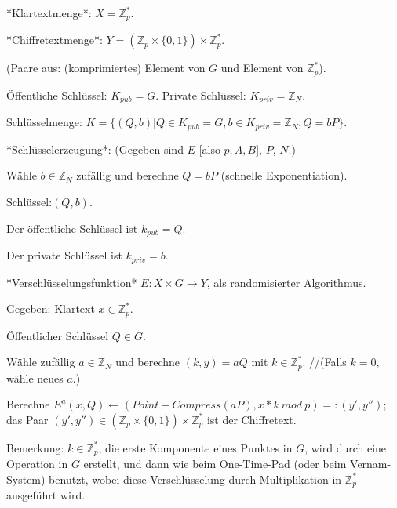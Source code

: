 \documentclass[a4paper]{article}
\begin{document}
\begin{multicols}{3}
        *Klartextmenge*: $X=\mathbb{Z}^*_p$.

        *Chiffretextmenge*: $Y=(\mathbb{Z}_p \times\{0,1\})\times\mathbb{Z}^*_p$.
        \begin{itemize*}
            \item (Paare aus: (komprimiertes) Element von $G$ und Element von $\mathbb{Z}^*_p$).
            \item Öffentliche Schlüssel: $K_{pub}=G$. Private Schlüssel: $K_{priv}=\mathbb{Z}_N$.
            \item Schlüsselmenge: $K=\{(Q,b)|Q\in K_{pub} = G,b\in K_{priv} =\mathbb{Z}_N,Q=bP\}$.
        \end{itemize*}

        *Schlüsselerzeugung*: (Gegeben sind $E$ [also $p,A,B$], $P$, $N$.)
        \begin{itemize*}
            \item Wähle $b\in\mathbb{Z}_N$ zufällig und berechne $Q=bP$ (schnelle Exponentiation).
            \item Schlüssel:$(Q,b)$.
            \item Der öffentliche Schlüssel ist $k_{pub}=Q$.
            \item Der private Schlüssel ist $k_{priv}=b$.
        \end{itemize*}

        *Verschlüsselungsfunktion* $E:X\times G\rightarrow Y$, als randomisierter Algorithmus.
        \begin{itemize*}
            \item Gegeben: Klartext $x\in\mathbb{Z}^*_p$.
            \item Öffentlicher Schlüssel $Q\in G$.
            \item Wähle zufällig $a\in\mathbb{Z}_N$ und berechne $(k,y) =aQ$ mit $k\in\mathbb{Z}^*_p$. //(Falls $k=0$, wähle neues $a$.)
            \item Berechne $E^a (x,Q)\leftarrow (Point-Compress(aP),x*k\ mod\ p) =: (y',y'');$ das Paar $(y',y'')\in(\mathbb{Z}_p\times\{0,1\})\times\mathbb{Z}^*_p$ ist der Chiffretext.
        \end{itemize*}

        Bemerkung: $k\in\mathbb{Z}^*_p$, die erste Komponente eines Punktes in $G$, wird durch eine Operation in $G$ erstellt, und dann wie beim One-Time-Pad (oder beim Vernam-System) benutzt, wobei diese Verschlüsselung durch Multiplikation in $\mathbb{Z}^*_p$ ausgeführt wird.


\end{multicols}
\end{document}
